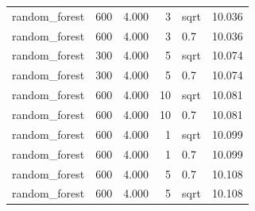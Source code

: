 \begin{tabular}{lrrrlr}
random_forest & 600 & 4.000 & 3 & sqrt & 10.036 \\
random_forest & 600 & 4.000 & 3 & 0.7 & 10.036 \\
random_forest & 300 & 4.000 & 5 & sqrt & 10.074 \\
random_forest & 300 & 4.000 & 5 & 0.7 & 10.074 \\
random_forest & 600 & 4.000 & 10 & sqrt & 10.081 \\
random_forest & 600 & 4.000 & 10 & 0.7 & 10.081 \\
random_forest & 600 & 4.000 & 1 & sqrt & 10.099 \\
random_forest & 600 & 4.000 & 1 & 0.7 & 10.099 \\
random_forest & 600 & 4.000 & 5 & 0.7 & 10.108 \\
random_forest & 600 & 4.000 & 5 & sqrt & 10.108 \\
\bottomrule
\end{tabular}
